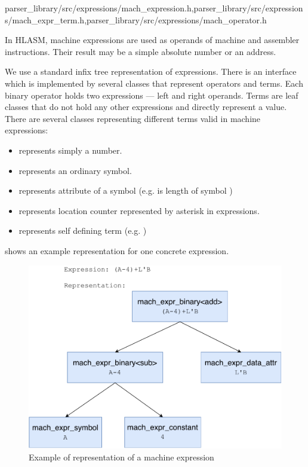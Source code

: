 {parser\_library/src/expressions/mach\_expression.h,parser\_library/src/expressions/mach\_expr\_term.h,parser\_library/src/expressions/mach\_operator.h}
\label{mach_expr}

In HLASM, machine expressions are used as operands of machine and assembler instructions. Their result may be a simple absolute number or an address.

We use a standard infix tree representation of expressions. There is an interface  which is implemented by several classes that represent operators and terms. Each binary operator holds two expressions --- left and right operands. Terms are leaf classes that do not hold any other expressions and directly represent a value. There are several classes representing different terms valid in machine expressions:
\begin{itemize}
	\item {} represents simply a number.
	\item {} represents an ordinary symbol.
	\item {} represents attribute of a symbol (e.g.  is length of symbol )
	\item {} represents location counter represented by asterisk in expressions. 
	\item {} represents self defining term (e.g. )
\end{itemize}
 shows an example representation for one concrete expression.

\begin{figure}
	\centering
	\includegraphics[width=13cm]{img/mach_expr_example}
	\caption{Example of representation of a machine expression}
	\label{mach_expr_example}
\end{figure}

